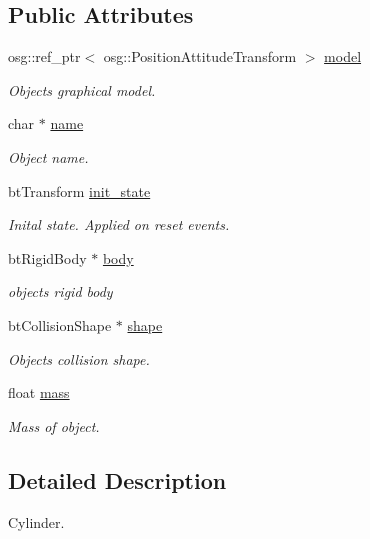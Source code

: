\subsection*{Public Attributes}
\begin{DoxyCompactItemize}
\item 
osg\+::ref\+\_\+ptr$<$ osg\+::\+Position\+Attitude\+Transform $>$ \hyperlink{classbtosgObject_afd15726e7a214212d6d5815f8ac1ac6c}{model}
\begin{DoxyCompactList}\small\item\em Object\textquotesingle{}s graphical model. \end{DoxyCompactList}\item 
char $\ast$ \hyperlink{classbtosgObject_a12396e1362797a75473a2e833b579cc9}{name}
\begin{DoxyCompactList}\small\item\em Object name. \end{DoxyCompactList}\item 
bt\+Transform \hyperlink{classbtosgObject_a2dee023f311114e200df9b04c8c1b400}{init\+\_\+state}
\begin{DoxyCompactList}\small\item\em Inital state. Applied on reset events. \end{DoxyCompactList}\item 
bt\+Rigid\+Body $\ast$ \hyperlink{classbtosgObject_a64ccde0543c184ed1749fdb9c9699785}{body}
\begin{DoxyCompactList}\small\item\em object\textquotesingle{}s rigid body \end{DoxyCompactList}\item 
bt\+Collision\+Shape $\ast$ \hyperlink{classbtosgObject_a0f6a8da01cf643c321bffe86e42604b0}{shape}
\begin{DoxyCompactList}\small\item\em Object\textquotesingle{}s collision shape. \end{DoxyCompactList}\item 
float \hyperlink{classbtosgObject_a2418bb2194d5e9b0f1c51c84672ba7d1}{mass}
\begin{DoxyCompactList}\small\item\em Mass of object. \end{DoxyCompactList}\end{DoxyCompactItemize}


\subsection{Detailed Description}
Cylinder. 

